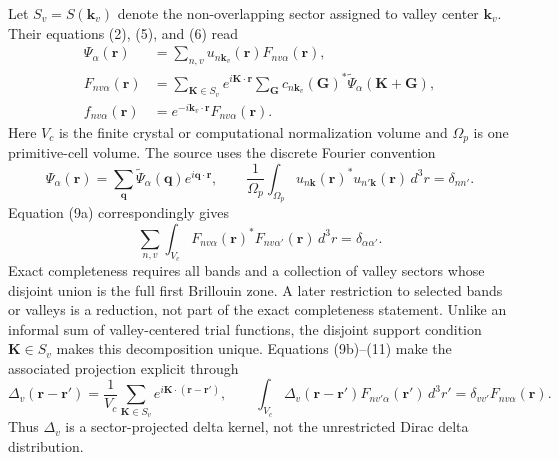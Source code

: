 Let $S_v=S(\mathbf k_v)$ denote the non-overlapping sector assigned to valley
center $\mathbf k_v$. Their equations (2), (5), and (6) read
\begin{align}
  \Psi_\alpha(\mathbf r)
  &=
  \sum_{n,v}u_{n\mathbf k_v}(\mathbf r)
  F_{nv\alpha}(\mathbf r),
  \label{eq:ermoneit-valley-expansion}\\
  F_{nv\alpha}(\mathbf r)
  &=
  \sum_{\mathbf K\in S_v}
  e^{i\mathbf K\cdot\mathbf r}
  \sum_{\mathbf G}c_{n\mathbf k_v}(\mathbf G)^{*}
  \widetilde\Psi_\alpha(\mathbf K+\mathbf G),
  \label{eq:ermoneit-sector-envelope}\\
  f_{nv\alpha}(\mathbf r)
  &=
  e^{-i\mathbf k_v\cdot\mathbf r}F_{nv\alpha}(\mathbf r).
  \label{eq:ermoneit-slow-envelope}
\end{align}
Here $V_c$ is the finite crystal or computational normalization volume and
$\Omega_p$ is one primitive-cell volume. The source uses the discrete Fourier
convention
\begin{equation}
  \Psi_\alpha(\mathbf r)
  =
  \sum_{\mathbf q}\widetilde\Psi_\alpha(\mathbf q)
  e^{i\mathbf q\cdot\mathbf r},
  \qquad
  \frac{1}{\Omega_p}\int_{\Omega_p}
  u_{n\mathbf k}(\mathbf r)^{*}u_{n'\mathbf k}(\mathbf r)\,d^3r
  =\delta_{nn'}.
  \label{eq:ermoneit-source-normalization}
\end{equation}
Equation (9a) correspondingly gives
\begin{equation}
  \sum_{n,v}\int_{V_c}
  F_{nv\alpha}(\mathbf r)^{*}F_{nv\alpha'}(\mathbf r)\,d^3r
  =\delta_{\alpha\alpha'}.
  \label{eq:ermoneit-envelope-normalization}
\end{equation}
Exact completeness requires all bands and a collection of valley sectors whose
disjoint union is the full first Brillouin zone. A later restriction to selected
bands or valleys is a reduction, not part of the exact completeness statement.
Unlike an informal sum of valley-centered trial functions, the disjoint support
condition $\mathbf K\in S_v$ makes this decomposition unique. Equations
(9b)--(11) make the associated projection explicit through
\begin{equation}
  \Delta_v(\mathbf r-\mathbf r')
  =
  \frac{1}{V_c}
  \sum_{\mathbf K\in S_v}
  e^{i\mathbf K\cdot(\mathbf r-\mathbf r')},
  \qquad
  \int_{V_c}\!\Delta_v(\mathbf r-\mathbf r')
  F_{n v'\alpha}(\mathbf r')\,d^3r'
  =
  \delta_{vv'}F_{nv\alpha}(\mathbf r).
  \label{eq:ermoneit-sector-projector}
\end{equation}
Thus $\Delta_v$ is a sector-projected delta kernel, not the unrestricted Dirac
delta distribution.

